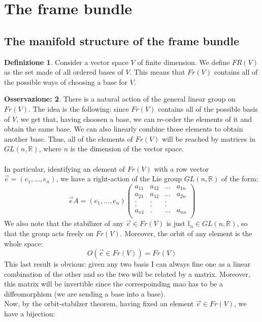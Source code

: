 \documentclass[12pt,a4paper]{report}
\theoremstyle{definition}
\newtheorem{Def}{Definizione}[chapter]
\theoremstyle{Theorem}
\theoremstyle{definition}
\theoremstyle{definition}
\theoremstyle{definition}
\newtheorem{Obs}[Def]{Osservazione:}
\begin{document}
	\section{The frame bundle}
	\subsection{The manifold structure of the frame bundle}
	\begin{Def}\label{Def_6.5}
		Consider a vector space $V$ of finite dimension. We define $FR(V)$ as the set made of all ordered bases of $V$. This means that $Fr(V)$ contains all of the possible ways of choosing a base for $V$.
	\end{Def}
	\begin{Obs}
		There is a natural action of the general linear group on $Fr(V)$. The idea is the following: since $Fr(V)$ contains all of the possible basis of $V$, we get that, having choosen a base, we can re-order the elements of it and obtain the same base. We can also linearly combine those elements to obtain another base. Thus, all of the elements of $Fr(V)$ will be reached by matrices in $GL(n,\mathbb{R})$, where $n$ is the dimension of the vector space.\\
		\\
		In particular, identifying an element of $Fr(V)$ with a row vector $\vec{e}=(e_1,...,e_n)$, we have a right-action of the Lie group $GL(n,\mathbb{R})$ of the form:
		$$\vec{e}A=(e_1,...,e_n)\begin{pmatrix}
			a_{11}&a_{12}&...&a_{1n}\\
			a_{21}&a_{12}&...&a_{2n}\\
			.     &.     &.   &     \\
			.     &.     &.   &     \\
			a_{n1}&.     &...&a_{nn}\\
		\end{pmatrix}$$
		We also note that the stabilizer of any $\vec{e}\in Fr(V)$ is just $\mathbb{I}_n\in GL(n,\mathbb{R})$, so that the group acts freely on $Fr(V)$. Moreover, the orbit of any element is the whole space: 
		$$O(\vec{e}\in Fr(V))=Fr(V)$$
		This last result is obvious: given any two basis I can always fine one as a linear combination of the other and so the two will be related by a matrix. Moreover, this matrix will be invertible since the correspoinding mao has to be a diffeomorphism (we are sending a base into a base).\\
		Now, by the orbit-stabilzer theorem, having fixed an element $\vec{e}\in Fr(V)$, we have a bijection:

\end{Obs}
\end{document}
